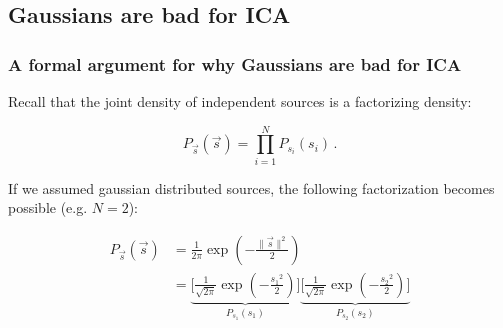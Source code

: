 \subsection{Gaussians are bad for ICA}


\subsubsection{A formal argument for why Gaussians are bad for ICA}

\begin{frame}{\subsubsecname}

Recall that the joint density of independent sources is a factorizing density:

\begin{equation}
\label{eq:facts}
P_{\vec s}(\vec s) = \prod_{i=1}^{N} P_{s_i}(s_i)  \,.
\end{equation}

If we assumed gaussian distributed sources, the following factorization becomes possible (e.g. $N=2$):

\begin{equation}
	\label{eq:factsgauss}
	\begin{array}{ll}
	P_{\vec{s}}({\vec{s}}) 
	& = \frac{1}{2\pi} 
    \exp \left( -\frac{\lVert{\vec{s}}\rVert^2}{2} \right)
	\\
	& = \underbrace{
	\Bigg[ \frac{1}{\sqrt{2\pi}} \exp \left( -
		\frac{{s_1}^2}{2} \right) \Bigg]
		}_{{P}_{s_1}({s}_1)}
		\underbrace{\Bigg[
			\frac{1}{\sqrt{2\pi}} \exp \left( -
			\frac{{s_2}^2}{2} \right)
		\Bigg]
			}_{{P}_{s_2}({s}_2)}
	\end{array}
\end{equation}
\end{frame}

